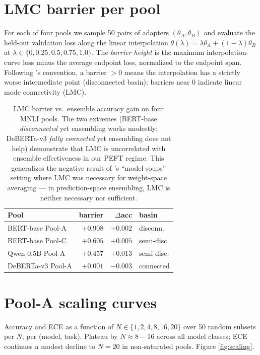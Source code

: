 \documentclass[11pt]{article}
\begin{document}
\section{LMC barrier per pool}\label{app:lmc}
For each of four pools we sample 50 pairs of adapters $(\theta_A, \theta_B)$ and evaluate the held-out validation loss along the linear interpolation $\theta(\lambda)=\lambda\theta_A+(1{-}\lambda)\theta_B$ at $\lambda\!\in\!\{0,0.25,0.5,0.75,1.0\}$. The \emph{barrier height} is the maximum interpolation-curve loss minus the average endpoint loss, normalized to the endpoint span. Following \citet{wortsman2022model}'s convention, a barrier $>0$ means the interpolation has a strictly worse intermediate point (disconnected basin); barriers near $0$ indicate linear mode connectivity (LMC).

\begin{table}[h]
\centering
\caption{LMC barrier vs.\ ensemble accuracy gain on four MNLI pools. The two extremes (BERT-base \emph{disconnected} yet ensembling works modestly; DeBERTa-v3 \emph{fully connected} yet ensembling does not help) demonstrate that LMC is uncorrelated with ensemble effectiveness in our PEFT regime. This generalizes the negative result of \citet{wortsman2022model}'s ``model soups'' setting where LMC was necessary for weight-space averaging --- in prediction-space ensembling, LMC is neither necessary nor sufficient.}
\label{tab:lmc}
\small
\setlength{\tabcolsep}{3pt}
\begin{tabular}{@{}lrrl@{}}
\toprule
Pool & barrier & $\Delta$acc & basin \\
\midrule
BERT-base Pool-A   & $+0.908$ & $+0.002$ & disconn. \\
BERT-base Pool-C   & $+0.605$ & $+0.005$ & semi-disc. \\
Qwen-0.5B Pool-A   & $+0.457$ & $+0.013$ & semi-disc. \\
DeBERTa-v3 Pool-A  & $+0.001$ & $-0.003$ & connected \\
\bottomrule
\end{tabular}
\end{table}

\section{Pool-A scaling curves}\label{app:scaling}
Accuracy and ECE as a function of $N \in \{1,2,4,8,16,20\}$ over 50 random subsets per $N$, per (model, task). Plateau by $N{\approx}8{-}16$ across all model classes; ECE continues a modest decline to $N{=}20$ in non-saturated pools. Figure \ref{fig:scaling}.
\end{document}
